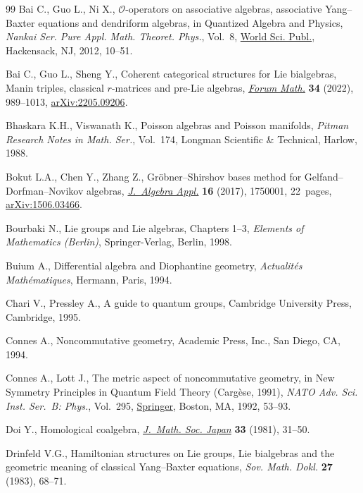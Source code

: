 \begin{thebibliography}{99}
Bai C., Guo L., Ni X., {$\mathcal{O}$}-operators on associative algebras,
 associative {Y}ang--{B}axter equations and dendriform algebras, in Quantized
 Algebra and Physics, \textit{Nankai Ser. Pure Appl. Math. Theoret. Phys.},
 Vol.~8, \href{https://doi.org/10.1142/9789814340458_0002}{World Sci. Publ.}, Hackensack, NJ, 2012, 10--51.

Bai C., Guo L., Sheng Y., Coherent categorical structures for {L}ie bialgebras,
 {M}anin triples, classical {$r$}-matrices and pre-{L}ie algebras,
 \href{https://doi.org/10.1515/forum-2021-0240}{\textit{Forum Math.}} \textbf{34} (2022), 989--1013, \href{https://arxiv.org/abs/2205.09206}{arXiv:2205.09206}.

Bhaskara K.H., Viswanath K., Poisson algebras and {P}oisson manifolds,
 \textit{Pitman Research Notes in Math. Ser.}, Vol.~174, Longman Scientific \&
 Technical, Harlow, 1988.

Bokut L.A., Chen Y., Zhang Z., Gr\"obner--{S}hirshov bases method for
 {G}elfand--{D}orfman--{N}ovikov algebras, \href{https://doi.org/10.1142/S0219498817500013}{\textit{J.~Algebra Appl.}}
 \textbf{16} (2017), 1750001, 22~pages, \href{https://arxiv.org/abs/1506.03466}{arXiv:1506.03466}.

Bourbaki N., Lie groups and {L}ie algebras, {C}hapters 1--3, \textit{Elements of
 Mathematics (Berlin)}, Springer-Verlag, Berlin, 1998.

Buium A., Differential algebra and {D}iophantine geometry, \textit{Actualit\'es
 Math\'ematiques}, Hermann, Paris, 1994.

Chari V., Pressley A., A guide to quantum groups, Cambridge University Press,
 Cambridge, 1995.

Connes A., Noncommutative geometry, Academic Press, Inc., San Diego, CA, 1994.

Connes A., Lott J., The metric aspect of noncommutative geometry, in New
 Symmetry Principles in Quantum Field Theory ({C}arg\`ese, 1991), \textit{NATO
 Adv. Sci. Inst. Ser.~B: Phys.}, Vol.~295, \href{https://doi.org/10.1007/978-1-4615-3472-3_3}{Springer}, Boston, MA, 1992, 53--93.

Doi Y., Homological coalgebra, \href{https://doi.org/10.2969/jmsj/03310031}{\textit{J.~Math. Soc. Japan}} \textbf{33} (1981),
 31--50.

Drinfeld V.G., Hamiltonian structures on {L}ie groups, {L}ie bialgebras and the
 geometric meaning of classical {Y}ang--{B}axter equations, \textit{Sov. Math.
 Dokl.} \textbf{27} (1983), 68--71.


\end{thebibliography}
